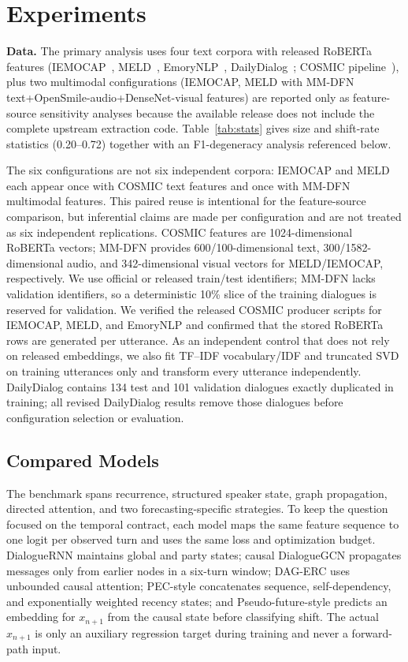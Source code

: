 \documentclass{ieeeaccess}
\begin{document}
\section{Experiments}
\label{sec:exp}

\textbf{Data.} The primary analysis uses four text corpora with released RoBERTa features
(IEMOCAP~\cite{busso2008iemocap}, MELD~\cite{poria2019meld}, EmoryNLP~\cite{zahiri2018emorynlp},
DailyDialog~\cite{li2017dailydialog}; COSMIC pipeline~\cite{ghosal2020cosmic}), plus two multimodal
configurations (IEMOCAP, MELD with MM-DFN~\cite{hu2021mmdfn}
text+OpenSmile-audio+DenseNet-visual features) are reported only as feature-source sensitivity
analyses because the available release does not include the complete upstream extraction code.
Table~\ref{tab:stats} gives size and shift-rate statistics (0.20--0.72) together with an
F1-degeneracy analysis referenced below.

The six configurations are not six independent corpora: IEMOCAP and MELD each appear once with
COSMIC text features and once with MM-DFN multimodal features. This paired reuse is intentional for
the feature-source comparison, but inferential claims are made per configuration and are not
treated as six independent replications. COSMIC features are 1024-dimensional RoBERTa vectors;
MM-DFN provides 600/100-dimensional text, 300/1582-dimensional audio, and 342-dimensional visual
vectors for MELD/IEMOCAP, respectively. We use official or released train/test identifiers;
MM-DFN lacks validation identifiers, so a deterministic 10\% slice of the training dialogues is
reserved for validation. We verified the released COSMIC producer scripts for IEMOCAP, MELD, and
EmoryNLP and confirmed that the stored RoBERTa rows are generated per utterance. As an independent
control that does not rely on released embeddings, we also fit TF--IDF vocabulary/IDF and truncated
SVD on training utterances only and transform every utterance independently. DailyDialog contains
134 test and 101 validation dialogues exactly duplicated in training; all revised DailyDialog
results remove those dialogues before configuration selection or evaluation.

\subsection{Compared Models}

The benchmark spans recurrence, structured speaker state, graph propagation, directed attention,
and two forecasting-specific strategies. To keep the question focused on the temporal contract,
each model maps the same feature sequence to one logit per observed turn and uses the same loss and
optimization budget. DialogueRNN maintains global and party states; causal DialogueGCN propagates
messages only from earlier nodes in a six-turn window; DAG-ERC uses unbounded causal attention;
PEC-style concatenates sequence, self-dependency, and exponentially weighted recency states; and
Pseudo-future-style predicts an embedding for $x_{n+1}$ from the causal state before classifying
shift. The actual $x_{n+1}$ is only an auxiliary regression target during training and never a
forward-path input.
\end{document}
